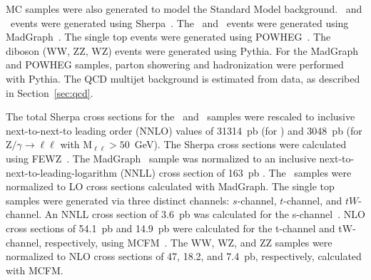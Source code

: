 MC samples were also generated to model the Standard Model background.
\wjets~and \zjets~events were generated using {\sc Sherpa}~\cite{sherpa}.
The \ttbar~and \gjets~events were generated using {\sc MadGraph}~\cite{madgraph-1,madgraph-2}.
The single top events were generated using {\sc POWHEG}~\cite{powheg-st,powheg-w,powheg-1,powheg-2,powheg-3}.
The diboson (WW, ZZ, WZ) events were generated using {\sc Pythia}.
For the {\sc MadGraph} and {\sc POWHEG} samples, parton showering and hadronization were performed with {\sc Pythia}.
The QCD multijet background is estimated from data, as described in Section~\ref{sec:qcd}.

The total {\sc Sherpa} cross sections for the \wjets~and \zjets~samples
were rescaled to inclusive next-to-next-to leading order (NNLO) values
of 31314~pb (for \wjets) and 3048~pb (for $\text{Z}/\gamma \rightarrow \ell\ell$ with
$\text{M}_{\ell\ell}>50$~GeV).  The {\sc Sherpa} cross sections were
calculated using {\sc FEWZ}~\cite{fewz}.
The {\sc MadGraph} \ttbar~sample was normalized to an 
inclusive next-to-next-to-leading-logarithm (NNLL)
cross section of 163~pb \cite{ttbar-xsection}.
The \gjets~samples were normalized to LO cross sections calculated with {\sc MadGraph}.
The single top samples were generated via three distinct
channels: $s$-channel, $t$-channel, and $tW$-channel.
An NNLL cross section of 3.6~pb was calculated for the s-channel~\cite{singletop-xsection}.
NLO cross sections of 54.1~pb and 14.9~pb were calculated for the t-channel and tW-channel, respectively,
using {\sc MCFM}~\cite{mcfm}.
The WW, WZ, and ZZ samples were normalized to NLO cross sections of 47, 18.2, and 7.4~pb, 
respectively, calculated with {\sc MCFM}. 

